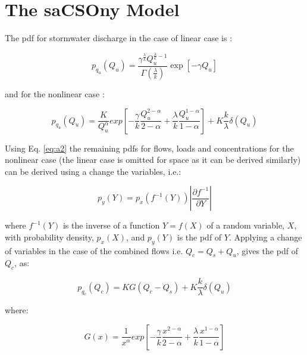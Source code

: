 \documentclass{agujournal2018}
\begin{document}
\section{The saCSOny Model}
The pdf for stormwater discharge in the case of linear case is \citep{Botter_2009}:
\begin{linenomath*}
\begin{equation} 
p_{q_u} \left(Q_u \right) = \frac{\gamma^{\frac{\lambda}{k}} Q_u^{\frac{\lambda}{k}-1}}{\Gamma\left(\frac{\lambda}{k}\right)}  \exp\left[-\gamma Q_u \right]
\label{eq:a1} 
\end{equation}
\end{linenomath*}
and for the nonlinear case \citep{Botter_2009}:
\begin{linenomath*}
\begin{equation}
p_{q_u}\left(Q_u \right) = \frac{K}{Q_u^{\alpha}} exp\left[-\frac{\gamma}{k}\frac{Q_u^{2-\alpha}}{2-\alpha} +\frac{\lambda}{k} \frac{Q_u^{1-\alpha}}{1-\alpha}   \right] + K \frac{k}{\lambda} \delta \left(Q_u\right)
\label{eq:a2}
\end{equation}
\end{linenomath*}
Using Eq. \ref{eq:a2} the remaining pdfs for f\/lows, loads and concentrations for the nonlinear case (the linear case is omitted for space as it can be derived similarly) can be derived using a change the variables, i.e.:
\begin{linenomath*}
\begin{equation}
p_y\left(Y\right) = p_x\left(f^{-1}\left(Y\right)\right) \left| \frac{\partial f^{-1}}{\partial Y} \right|	
\label{eq:a3}
\end{equation}
\end{linenomath*}
where $f^{-1}\left(Y\right)$ is the inverse of a function $Y=f\left(X\right)$ of a random variable, $X$, with probability density, $p_x \left(X\right)$, and $p_y\left(Y\right)$ is the pdf of $Y$. Applying a change of variables in the case of the combined f\/lows i.e. $Q_c = Q_s+Q_u$, gives the pdf of $Q_c$, as:
\begin{linenomath*}
\begin{equation}
p_{q_c}\left(Q_c \right) = K G\left(Q_c - Q_s \right) + K \frac{k}{\lambda} \delta \left(Q_u\right)
\label{eq:a4}
\end{equation}
\end{linenomath*}
where:
\begin{linenomath*}
\begin{equation}
G\left(x \right) = \frac{1}{x^{\alpha}} exp\left[-\frac{\gamma}{k}\frac{x^{2-\alpha}}{2-\alpha} +\frac{\lambda}{k} \frac{x^{1-\alpha}}{1-\alpha}   \right]
\label{eq:a5}
\end{equation}
\end{linenomath*}
\end{document}
